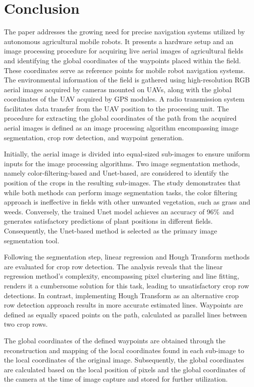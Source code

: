 \documentclass[conference]{IEEEtran}
\begin{document}
\section{Conclusion}\label{Conclusion}
The paper addresses the growing need for precise navigation systems utilized by autonomous agricultural mobile robots. It presents a hardware setup and an image processing procedure for acquiring live aerial images of agricultural fields and identifying the global coordinates of the waypoints placed within the field. These coordinates serve as reference points for mobile robot navigation systems. The environmental information of the field is gathered using high-resolution RGB aerial images acquired by cameras mounted on UAVs, along with the global coordinates of the UAV acquired by GPS modules. A radio transmission system facilitates data transfer from the UAV position to the processing unit. The procedure for extracting the global coordinates of the path from the acquired aerial images is defined as an image processing algorithm encompassing image segmentation, crop row detection, and waypoint generation.

Initially, the aerial image is divided into equal-sized sub-images to ensure uniform inputs for the image processing algorithms. Two image segmentation methods, namely color-filtering-based and Unet-based, are considered to identify the position of the crops in the resulting sub-images. The study demonstrates that while both methods can perform image segmentation tasks, the color filtering approach is ineffective in fields with other unwanted vegetation, such as grass and weeds. Conversely, the trained Unet model achieves an accuracy of 96\%\ and generates satisfactory predictions of plant positions in different fields. Consequently, the Unet-based method is selected as the primary image segmentation tool.

Following the segmentation step, linear regression and Hough Transform methods are evaluated for crop row detection. The analysis reveals that the linear regression method's complexity, encompassing pixel clustering and line fitting, renders it a cumbersome solution for this task, leading to unsatisfactory crop row detections. In contrast, implementing Hough Transform as an alternative crop row detection approach results in more accurate estimated lines. Waypoints are defined as equally spaced points on the path, calculated as parallel lines between two crop rows.

The global coordinates of the defined waypoints are obtained through the reconstruction and mapping of the local coordinates found in each sub-image to the local coordinates of the original image. Subsequently, the global coordinates are calculated based on the local position of pixels and the global coordinates of the camera at the time of image capture and stored for further utilization.
\end{document}
